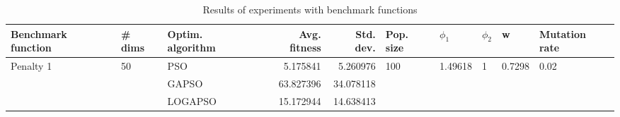 \begin{table}
\centering
\caption{Results of experiments with benchmark functions}
\begin{tabular}{lllrrlllll}
\toprule
        Benchmark function &             \# dims & Optim. algorithm &  Avg. fitness &  Std. dev. &            Pop. size &               $\phi_{1}$ &         $\phi_{2}$ &                       w &         Mutation rate \\
\midrule
\multirow{3}{*}{Penalty 1} & \multirow{3}{*}{50} &              PSO &      5.175841 &   5.260976 & \multirow{3}{*}{100} & \multirow{3}{*}{1.49618} & \multirow{3}{*}{1} & \multirow{3}{*}{0.7298} & \multirow{3}{*}{0.02} \\
                           &                     &            GAPSO &     63.827396 &  34.078118 &                      &                          &                    &                         &                       \\
                           &                     &          LOGAPSO &     15.172944 &  14.638413 &                      &                          &                    &                         &                       \\
\bottomrule
\end{tabular}
\end{table}
